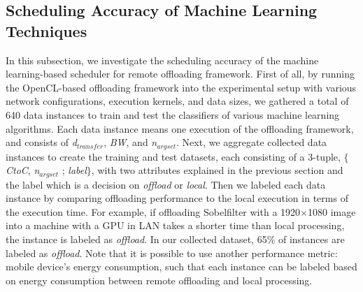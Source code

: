 \documentclass[10pt, conference, compsocconf]{IEEEtran}
\begin{document}
\subsection{Scheduling Accuracy of Machine Learning Techniques}
In this subsection, we investigate the scheduling accuracy of the
machine learning-based scheduler for remote offloading framework.
%
First of all, by running the OpenCL-based offloading framework into
the experimental setup with various network configurations, execution
kernels, and data sizes, we gathered a total of 640 data instances to train 
and test the classifiers of various machine learning algorithms.
%
Each data instance means one execution of the offloading framework, and
consists of \textit{d$_{transfer}$}, \textit{BW}, and
\textit{n$_{argset}$}.
%
Next, we aggregate collected data instances to create the
training and test datasets, each consisting of a 3-tuple, $\{$\textit{CtoC},
\textit{n$_{argset}$} ; \textit{label}$\}$, with two attributes explained 
in the previous section and the label which is a decision on 
\textit{offload} or \textit{local}.
%
Then we labeled each data instance by comparing offloading 
performance to the local execution in terms of the execution time.
%
For example, if offloading Sobelfilter with a 1920$\times$1080 image
into a machine with a GPU in LAN takes a shorter time than
local processing, the instance is labeled as \textit{offload}.
%
In our collected dataset, 65\% of instances are labeled as
\textit{offload}.
%
Note that it is possible to use another performance metric: mobile
device's energy consumption, such that each instance can be labeled
based on energy consumption between remote offloading and local
processing.
%
%
%
%
%
\end{document}

